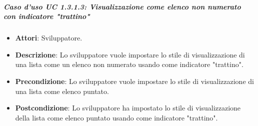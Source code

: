 \subparagraph{Caso d'uso UC 1.3.1.3: Visualizzazione come elenco non numerato con indicatore "trattino"}

\FloatBarrier
\begin{itemize}
\item\textbf{Attori}: Sviluppatore.
\item\textbf{Descrizione}: Lo sviluppatore vuole impostare lo stile di visualizzazione di una lista come un elenco non numerato usando come indicatore "trattino".
\item\textbf{Precondizione}: Lo sviluppatore vuole impostare lo stile di visualizzazione di una lista come elenco puntato.
\item\textbf{Postcondizione}: Lo sviluppatore ha impostato lo stile di visualizzazione della lista come elenco puntato usando come indicatore "trattino".
\end{itemize}

